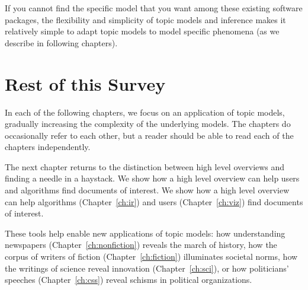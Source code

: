 If you cannot find the specific model that you want among these
existing software packages, the flexibility and simplicity of topic
models and inference makes it relatively simple to adapt topic models
to model specific phenomena (as we describe in following chapters).

\section{Rest of this Survey}


In each of the following chapters, we focus on an application of topic
models, gradually increasing the complexity of the underlying models.
The chapters do occasionally refer to each other, but a reader should
be able to read each of the chapters independently.

The next chapter returns to the distinction between high level
overviews and finding a needle in a haystack.  We show how a high
level overview can help users and algorithms find documents of
interest.  We show how a high level overview can help
algorithms (Chapter~\ref{ch:ir}) and users (Chapter~\ref{ch:viz}) find documents
of interest.

These tools help enable new applications of topic models: how
understanding newspapers (Chapter~\ref{ch:nonfiction}) reveals the
march of history, how the corpus of writers of fiction
(Chapter~\ref{ch:fiction}) illuminates societal norms, how the
writings of science reveal innovation (Chapter~\ref{ch:sci}), or
how politicians' speeches (Chapter~\ref{ch:css}) reveal schisms in
political organizations.
